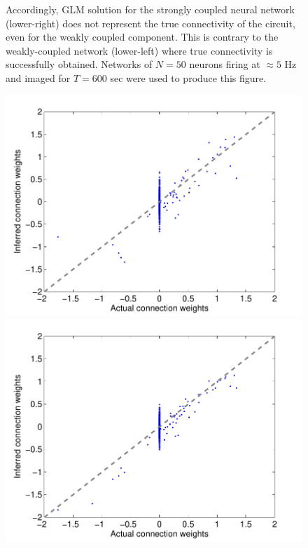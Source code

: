 \begin{figure}[h]
{Accordingly, GLM solution for the strongly coupled neural network (lower-right) does not
represent the true connectivity of the circuit, even for the weakly coupled component. This is contrary to the weakly-coupled network (lower-left) where true connectivity is successfully obtained.
Networks of $N=50$ neurons firing at $\approx 5$ Hz and imaged for $T=600$ sec were used to produce this figure.}
\label{fig:rasters}
\end{figure}

\begin{figure}[h]
\centering
\begin{minipage}[c]{0.45\hsize}
\includegraphics[width=\hsize]{../figs/FigureA9_all_same_sol}
\end{minipage}
\begin{minipage}[c]{0.45\hsize}
\includegraphics[width=\hsize]{../figs/FigureA9_variable_25}

\end{minipage}
\end{figure}
